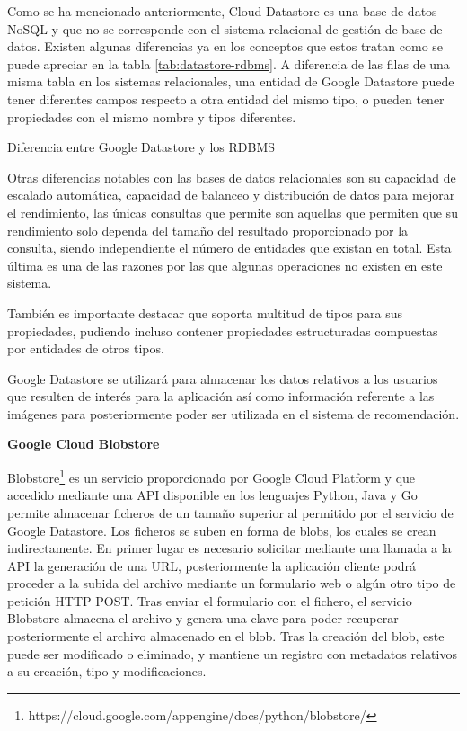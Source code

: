 Como se ha mencionado anteriormente, Cloud Datastore es una base de datos NoSQL y que no se corresponde con el sistema relacional de gestión de base de datos. Existen algunas diferencias ya en los conceptos que estos tratan como se puede apreciar en la tabla \ref{tab:datastore-rdbms}. A diferencia de las filas de una misma tabla en los sistemas relacionales, una entidad de Google Datastore puede tener diferentes campos respecto a otra entidad del mismo tipo, o pueden tener propiedades con el mismo nombre y tipos diferentes. 

\begin{table}[hp]
  \centering
  {\small
  
  }
  \caption[Diferencia entre Google Datastore y los \acs{RDBMS}]
  {Diferencia entre Google Datastore y los \acs{RDBMS}}
  \label{tab:datastore-rdbms}
\end{table}

Otras diferencias notables con las bases de datos relacionales son su capacidad de escalado automática, capacidad de balanceo y distribución de datos para mejorar el rendimiento, las únicas consultas que permite son aquellas que permiten que su rendimiento solo dependa del tamaño del resultado proporcionado por la consulta, siendo independiente el número de entidades que existan en total. Esta última es una de las razones por las que algunas operaciones no existen en este sistema.

También es importante destacar que soporta multitud de tipos para sus propiedades, pudiendo incluso contener propiedades estructuradas compuestas por entidades de otros tipos.

Google Datastore se utilizará para almacenar los datos relativos a los usuarios que resulten de interés para la aplicación así como información referente a las imágenes para posteriormente poder ser utilizada en el sistema de recomendación.


\textbf{Google Cloud Blobstore}

Blobstore\footnote{https://cloud.google.com/appengine/docs/python/blobstore/} es un servicio proporcionado por Google Cloud Platform y que accedido mediante una \acs{API} disponible en los lenguajes Python, Java y Go permite almacenar ficheros de un tamaño superior al permitido por el servicio de Google Datastore. Los ficheros se suben en forma de blobs, los cuales se crean indirectamente. En primer lugar  es necesario solicitar mediante una llamada a la \acs{API} la generación de una \acs{URL}, posteriormente la aplicación cliente podrá proceder a la subida del archivo mediante un formulario web o algún otro tipo de petición \acs{HTTP} POST. Tras enviar el formulario con el fichero, el servicio Blobstore almacena el archivo y genera una clave para poder recuperar posteriormente el archivo almacenado en el blob. Tras la creación del blob, este puede ser modificado o eliminado, y mantiene un registro con metadatos relativos a su creación, tipo y modificaciones.

